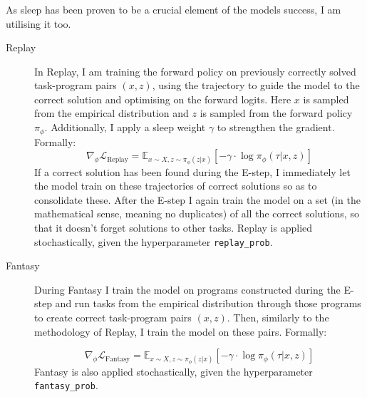 \subsubsection{}
As sleep has been proven to be a crucial element of the models success, I am utilising it too. 
\begin{description}
    \item[Replay] In Replay, I am training the forward policy on previously correctly solved task-program pairs $(x, z)$, using the trajectory to guide the model to the correct solution and optimising on the forward logits. Here $x$ is sampled from the empirical distribution and $z$ is sampled from the forward policy $\pi_\phi$. Additionally, I apply a sleep weight $\gamma$ to strengthen the gradient. Formally:
    \begin{equation}
        \nabla_\phi\mathcal{L}_{\text{Replay}} = \mathbb{E}_{x \sim X, z \sim \pi_\phi(z|x)} \left[ - \gamma \cdot \log \pi_\phi(\tau \vert x, z) \right]
    \end{equation}
    If a correct solution has been found during the E-step, I immediately let the model train on these trajectories of correct solutions so as to consolidate these.
After the E-step I again train the model on a set (in the mathematical sense, meaning no duplicates) of all the correct solutions, so that it doesn't forget solutions to other tasks.
Replay is applied stochastically, given the hyperparameter \texttt{replay\_prob}.
    \item[Fantasy] During Fantasy I train the model on programs constructed during the E-step and run tasks from the empirical distribution through those programs to create correct task-program pairs $(x, z)$. Then, similarly to the methodology of Replay, I train the model on these pairs. Formally:

    \begin{equation}
        \nabla_\phi\mathcal{L}_{\text{Fantasy}} = \mathbb{E}_{x \sim X, z \sim \pi_\phi(z|x)} \left[ - \gamma \cdot \log \pi_\phi(\tau \vert x, z) \right]
    \end{equation}
    Fantasy is also applied stochastically, given the hyperparameter \texttt{fantasy\_prob}. 
\end{description}


